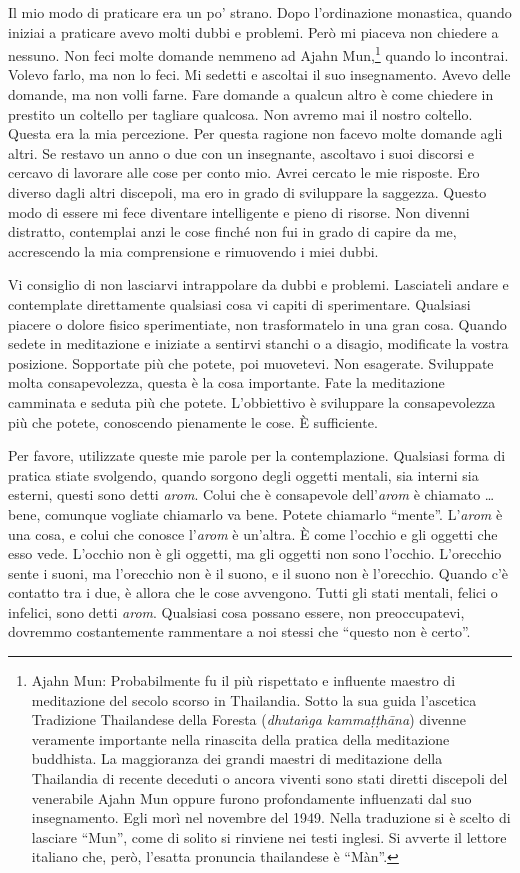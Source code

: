 Il mio modo di praticare era un po' strano. Dopo l'ordinazione
monastica, quando iniziai a praticare avevo molti dubbi e problemi. Però
mi piaceva non chiedere a nessuno. Non feci molte domande nemmeno ad
Ajahn Mun,\footnote{Ajahn Mun: Probabilmente fu il più rispettato e
  influente maestro di meditazione del secolo scorso in Thailandia.
  Sotto la sua guida l'ascetica Tradizione Thailandese della Foresta
  (\emph{dhutaṅga kammaṭṭhāna}) divenne veramente importante nella
  rinascita della pratica della meditazione buddhista. La maggioranza
  dei grandi maestri di meditazione della Thailandia di recente deceduti
  o ancora viventi sono stati diretti discepoli del venerabile Ajahn Mun
  oppure furono profondamente influenzati dal suo insegnamento. Egli
  morì nel novembre del 1949. Nella traduzione si è scelto di lasciare
  ``Mun'', come di solito si rinviene nei testi inglesi. Si avverte il
  lettore italiano che, però, l'esatta pronuncia thailandese è ``Màn''.}
quando lo incontrai. Volevo farlo, ma non lo feci. Mi sedetti e ascoltai
il suo insegnamento. Avevo delle domande, ma non volli farne. Fare
domande a qualcun altro è come chiedere in prestito un coltello per
tagliare qualcosa. Non avremo mai il nostro coltello. Questa era la mia
percezione. Per questa ragione non facevo molte domande agli altri. Se
restavo un anno o due con un insegnante, ascoltavo i suoi discorsi e
cercavo di lavorare alle cose per conto mio. Avrei cercato le mie
risposte. Ero diverso dagli altri discepoli, ma ero in grado di
sviluppare la saggezza. Questo modo di essere mi fece diventare
intelligente e pieno di risorse. Non divenni distratto, contemplai anzi
le cose finché non fui in grado di capire da me, accrescendo la mia
comprensione e rimuovendo i miei dubbi.

Vi consiglio di non lasciarvi intrappolare da dubbi e problemi.
Lasciateli andare e contemplate direttamente qualsiasi cosa vi capiti di
sperimentare. Qualsiasi piacere o dolore fisico sperimentiate, non
trasformatelo in una gran cosa. Quando sedete in meditazione e iniziate
a sentirvi stanchi o a disagio, modificate la vostra posizione.
Sopportate più che potete, poi muovetevi. Non esagerate. Sviluppate
molta consapevolezza, questa è la cosa importante. Fate la meditazione
camminata e seduta più che potete. L'obbiettivo è sviluppare la
consapevolezza più che potete, conoscendo pienamente le cose. È
sufficiente.

Per favore, utilizzate queste mie parole per la contemplazione.
Qualsiasi forma di pratica stiate svolgendo, quando sorgono degli
oggetti mentali, sia interni sia esterni, questi sono detti \emph{arom}.
Colui che è consapevole dell'\emph{arom} è chiamato \ldots{} bene, comunque
vogliate chiamarlo va bene. Potete chiamarlo ``mente''. L'\emph{arom} è
una cosa, e colui che conosce l'\emph{arom} è un'altra. È come l'occhio
e gli oggetti che esso vede. L'occhio non è gli oggetti, ma gli oggetti
non sono l'occhio. L'orecchio sente i suoni, ma l'orecchio non è il
suono, e il suono non è l'orecchio. Quando c'è contatto tra i due, è
allora che le cose avvengono. Tutti gli stati mentali, felici o
infelici, sono detti \emph{arom}. Qualsiasi cosa possano essere, non
preoccupatevi, dovremmo costantemente rammentare a noi stessi che
``questo non è certo''.

